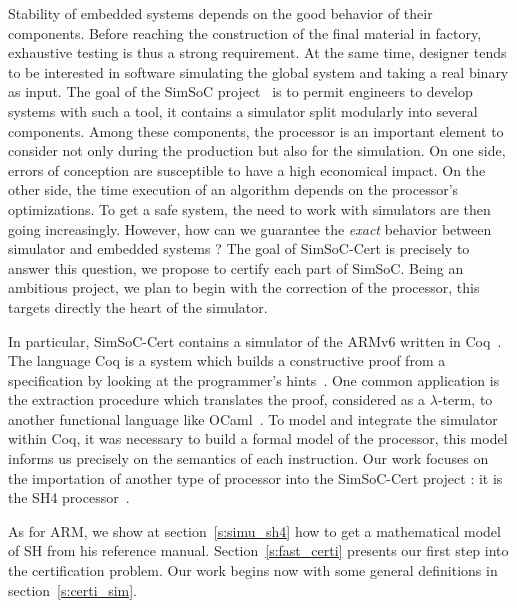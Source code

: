 \documentclass[a4paper, 11pt]{article}
\newcommand{\simsoc}{SimSoC\xspace}
\newcommand{\SScert}{SimSoC-Cert\xspace}
\begin{document}
Stability of embedded systems depends on the good behavior of their components. Before reaching the construction of the final material in factory, exhaustive testing is thus a strong requirement. At the same time, designer tends to be interested in software simulating the global system and taking a real binary as input. The goal of the \simsoc project~\cite{ossc09} is to permit engineers to develop systems with such a tool, it contains a simulator split modularly into several components. Among these components, the processor is an important element to consider not only during the production but also for the simulation. On one side, errors of conception are susceptible to have a high economical impact. On the other side, the time execution of an algorithm depends on the processor's optimizations. To get a safe system, the need to work with simulators are then going increasingly. However, how can we guarantee the \emph{exact} behavior between simulator and embedded systems ? 
The goal of \SScert is precisely to answer this question, we propose to certify each part of \simsoc. Being an ambitious project, we plan to begin with the correction of the processor, this targets directly the heart of the simulator.

In particular, \SScert contains a simulator of the ARMv6 written in Coq~\cite{arm6refman, arm}. The language Coq is a system which builds a constructive proof from a specification by looking at the programmer's hints~\cite{Coq:manual}. One common application is the extraction procedure which translates the proof, considered as a $\lambda$-term, to another functional language like OCaml~\cite{OCaml}. To model and integrate the simulator within Coq, it was necessary to build a formal model of the processor, this model informs us precisely on the semantics of each instruction.
Our work focuses on the importation of another type of processor into the \SScert project : it is the SH4 processor~\cite{sh4refman}. 

As for ARM, we show at section~\ref{s:simu_sh4} how to get a mathematical model of SH from his reference manual. Section~\ref{s:fast_certi} presents our first step into the certification problem. Our work begins now with some general definitions in section~\ref{s:certi_sim}.
\end{document}
